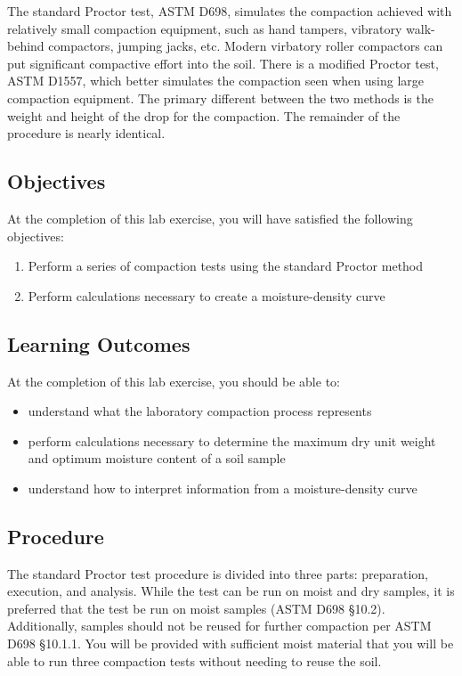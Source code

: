 \documentclass[12pt]{article}
\begin{document}
The standard Proctor test, ASTM D698, simulates the compaction achieved with relatively small compaction equipment, such as hand tampers, vibratory walk-behind compactors, jumping jacks, etc. Modern virbatory roller compactors can put significant compactive effort into the soil. There is a modified Proctor test, ASTM D1557, which better simulates the compaction seen when using large compaction equipment. The primary different between the two methods is the weight and height of the drop for the compaction. The remainder of the procedure is nearly identical.

\subsection{Objectives}
\label{ssec:headingscap}
At the completion of this lab exercise, you will have satisfied the following objectives:
\begin{enumerate}
    \item Perform a series of compaction tests using the standard Proctor method
    \item Perform calculations necessary to create a moisture-density curve
\end{enumerate}

\subsection{Learning Outcomes}
At the completion of this lab exercise, you should be able to:
\begin{itemize}
    \item understand what the laboratory compaction process represents
    \item perform calculations necessary to determine the maximum dry unit weight and optimum moisture content of a soil sample
    \item understand how to interpret information from a moisture-density curve
\end{itemize}

\pagebreak
\subsection{Procedure}
The standard Proctor test procedure is divided into three parts: preparation, execution, and analysis. While the test can be run on moist and dry samples, it is preferred that the test be run on moist samples (ASTM D698 \S10.2). Additionally, samples should not be reused for further compaction per ASTM D698 \S10.1.1. You will be provided with sufficient moist material that you will be able to run three compaction tests without needing to reuse the soil.
\end{document}
